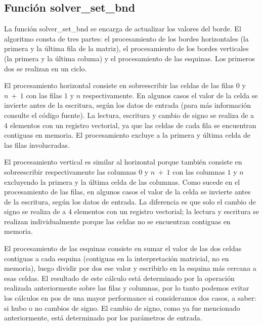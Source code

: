 \subsection{Función solver\_set\_bnd}
\par La función solver\_set\_bnd se encarga de actualizar los valores del borde. El algoritmo consta de tres partes: el procesamiento de los bordes horizontales (la primera y la última fila de la matriz), el procesamiento de los bordes verticales (la primera y la última columa) y el procesamiento de las esquinas. Los primeros dos se realizan en un ciclo.\newline
\par El procesamiento horizontal consiste en sobreescribir las celdas de las filas $0$ y $n\ +\ 1$ con las filas $1$ y $n$ respectivamente. En algunos casos el valor de la celda se invierte antes de la escritura, según los datos de entrada (para más información consulte el código fuente). La lectura, escritura y cambio de signo se realiza de a $4$ elementos con un registro vectorial, ya que las celdas de cada fila se encuentran contiguas en memoria. El procesamiento excluye a la primera y última celda de las filas involucradas.\newline
\par El procesamiento vertical es similar al horizontal porque también consiste en sobreescribir respectivamente las columnas $0$ y $n\ +\ 1$ con las columnas $1$ y $n$ excluyendo la primera y la última celda de las columnas. Como sucede en el procesamiento de las filas, en algunos casos el valor de la celda se invierte antes de la escritura, según los datos de entrada. La diferencia es que solo el cambio de signo se realiza de a $4$ elementos con un registro vectorial; la lectura y escritura se realizan individualmente porque las celdas no se encuentran contiguas en memoria.\newline
\par El procesamiento de las esquinas consiste en sumar el valor de las dos celdas contiguas a cada esquina (contiguas en la interpretación matricial, no en memoria), luego dividir por dos ese valor y escribirlo en la esquina más cercana a esas celdas. El resultado de este cálculo está determinado por la operación realizada anteriormente sobre las filas y columnas, por lo tanto podemos evitar los cálculos en pos de una mayor performance si consideramos dos casos, a saber: si hubo o no cambios de signo. El cambio de signo, como ya fue mencionado anteriormente, está determinado por los parámetros de entrada.\newline
